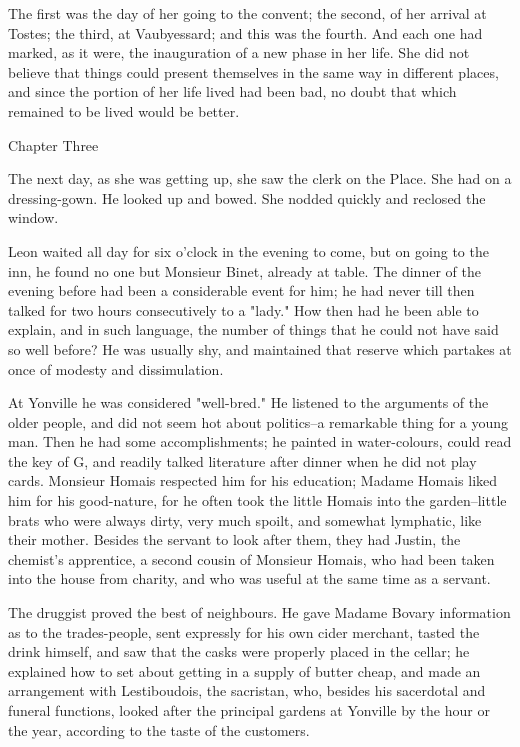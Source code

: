 \documentclass{tufte-book}
\begin{document}
The first was the day of her going to the convent; the second, of her
arrival at Tostes; the third, at Vaubyessard; and this was the fourth.
And each one had marked, as it were, the inauguration of a new phase in
her life. She did not believe that things could present themselves in
the same way in different places, and since the portion of her life
lived had been bad, no doubt that which remained to be lived would be
better.



Chapter Three

The next day, as she was getting up, she saw the clerk on the Place. She
had on a dressing-gown. He looked up and bowed. She nodded quickly and
reclosed the window.

Leon waited all day for six o'clock in the evening to come, but on going
to the inn, he found no one but Monsieur Binet, already at table. The
dinner of the evening before had been a considerable event for him; he
had never till then talked for two hours consecutively to a "lady." How
then had he been able to explain, and in such language, the number of
things that he could not have said so well before? He was usually
shy, and maintained that reserve which partakes at once of modesty and
dissimulation.

At Yonville he was considered "well-bred." He listened to the arguments
of the older people, and did not seem hot about politics--a remarkable
thing for a young man. Then he had some accomplishments; he painted in
water-colours, could read the key of G, and readily talked literature
after dinner when he did not play cards. Monsieur Homais respected him
for his education; Madame Homais liked him for his good-nature, for
he often took the little Homais into the garden--little brats who were
always dirty, very much spoilt, and somewhat lymphatic, like their
mother. Besides the servant to look after them, they had Justin, the
chemist's apprentice, a second cousin of Monsieur Homais, who had been
taken into the house from charity, and who was useful at the same time
as a servant.

The druggist proved the best of neighbours. He gave Madame Bovary
information as to the trades-people, sent expressly for his own cider
merchant, tasted the drink himself, and saw that the casks were properly
placed in the cellar; he explained how to set about getting in a
supply of butter cheap, and made an arrangement with Lestiboudois, the
sacristan, who, besides his sacerdotal and funeral functions, looked
after the principal gardens at Yonville by the hour or the year,
according to the taste of the customers.
\end{document}
